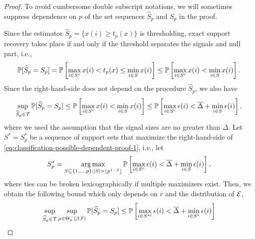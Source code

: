 \begin{proof} %
To avoid cumbersome double subscript notations, we will sometimes suppress dependence on $p$ of the set sequences $\widehat{S}_p$ and $S_p$ in the proof.

Since the estimator $\widehat{S}_p = \{x(i) \ge t_p(x)\}$ is thresholding, exact support recovery takes place if and only if the threshold separates the signals and null part, i.e.,
\begin{equation*}
    \P[\widehat{S}_p = S_p] 
    = \P\left[\max_{i\in S^c}x(i) < t_p(x) \le \min_{i\in S}x(i)\right]
    \le \P\left[\max_{i\in S^c}x(i) < \min_{i\in S}x(i)\right].
\end{equation*}
Since the right-hand-side does not depend on the procedure $\widehat{S}_p$, we also have
\begin{equation} \label{eq:classification-possible-dependent-proof-1}
    \sup_{\widehat{S}_p\in{\cal T}} \P[\widehat{S}_p = S_p] 
    \le \P\left[\max_{i\in S^c}x(i) < \min_{i\in S}x(i)\right]
    \le \P\left[{\max_{i\in S^c}\epsilon(i)} < {\overline{\Delta} + \min_{i\in S}\epsilon(i)}\right],
\end{equation}
where we used the assumption that the signal sizes are no greater than $\overline{\Delta}$.
Let $S^* = S_p^*$ be a sequence of support sets that maximize the right-hand-side of \eqref{eq:classification-possible-dependent-proof-1}, i.e., let
$$
S_p^* = \argmax_{S\subseteq\{1,\ldots,p\}:|S| = \lfloor p^{1-\beta}\rfloor} \P\left[{\max_{i\in S^c}\epsilon(i)} < {\overline{\Delta} + \min_{i\in S}\epsilon(i)}\right],
$$
where ties can be broken lexicographically if multiple maximizers exist.
Then,
we obtain the following bound which only depends on $\overline{r}$ and the distribution of ${\cal E}$,
\begin{align}
    \sup_{\widehat{S}_p\in{\cal T}} \sup_{\mu\in\Theta^-_p(\beta,\overline{r})} \P[\widehat{S}_p = S_p] 
    &\le \P\left[{\max_{i\in S^{*c}}\epsilon(i)} < {\overline{\Delta} + \min_{i\in S^*}\epsilon(i)}\right] \nonumber \\

\end{align}
\end{proof}
